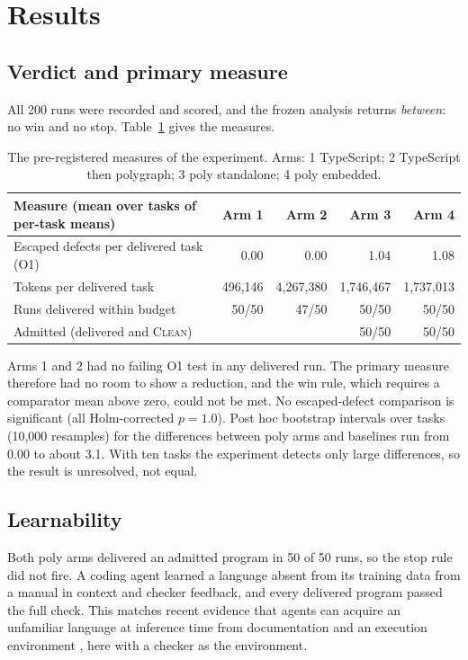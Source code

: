 \documentclass[11pt]{article}
\newcommand{\poly}{\textsf{poly}}
\begin{document}
\section{Results}
\label{sec:results}

\subsection{Verdict and primary measure}

All 200 runs were recorded and scored, and the frozen analysis returns \emph{between}: no win and no stop. Table~\ref{tab:m3} gives the measures.

\begin{table}[t]
\centering
\small
\begin{tabular}{lrrrr}
\toprule
Measure (mean over tasks of per-task means) & Arm 1 & Arm 2 & Arm 3 & Arm 4\\
\midrule
Escaped defects per delivered task (O1) & 0.00 & 0.00 & 1.04 & 1.08\\
Tokens per delivered task & 496,146 & 4,267,380 & 1,746,467 & 1,737,013\\
Runs delivered within budget & 50/50 & 47/50 & 50/50 & 50/50\\
Admitted (delivered and \textsc{Clean}) & & & 50/50 & 50/50\\
\bottomrule
\end{tabular}
\caption{The pre-registered measures of the experiment. Arms: 1 TypeScript; 2 TypeScript then polygraph; 3 \poly{} standalone; 4 \poly{} embedded.}
\label{tab:m3}
\end{table}

Arms 1 and 2 had no failing O1 test in any delivered run. The primary measure therefore had no room to show a reduction, and the win rule, which requires a comparator mean above zero, could not be met. No escaped-defect comparison is significant (all Holm-corrected $p = 1.0$). Post hoc bootstrap intervals over tasks (10,000 resamples) for the differences between \poly{} arms and baselines run from 0.00 to about 3.1. With ten tasks the experiment detects only large differences, so the result is unresolved, not equal.

\subsection{Learnability}

Both \poly{} arms delivered an admitted program in 50 of 50 runs, so the stop rule did not fire. A coding agent learned a language absent from its training data from a manual in context and checker feedback, and every delivered program passed the full check. This matches recent evidence that agents can acquire an unfamiliar language at inference time from documentation and an execution environment \cite{shen2026ila}, here with a checker as the environment.
\end{document}
